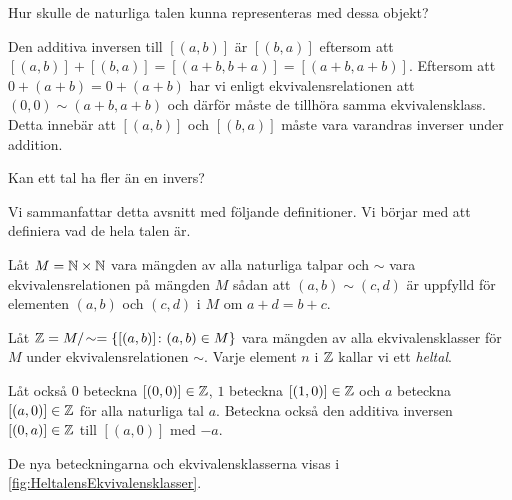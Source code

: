 \begin{exercise}
  Hur skulle de naturliga talen kunna representeras med dessa objekt?
\end{exercise}

Den additiva inversen till \([(a,b)]\) är \([(b,a)]\) eftersom att
\([(a,b)]+[(b,a)]=[(a+b,b+a)]=[(a+b,a+b)]\).
Eftersom att \(0+(a+b)=0+(a+b)\) har vi enligt ekvivalensrelationen att
\((0,0)\sim (a+b,a+b)\) och därför måste de tillhöra samma ekvivalensklass.
Detta innebär att \([(a,b)]\) och \([(b,a)]\) måste vara varandras inverser
under addition.

\begin{exercise}
  Kan ett tal ha fler än en invers?
\end{exercise}

Vi sammanfattar detta avsnitt med följande definitioner.
Vi börjar med att definiera vad de hela talen är.
\begin{definition}[Heltalen]
  Låt \(M=\mathbb{N}\times\mathbb{N}\) vara mängden av alla naturliga talpar och \(\sim\)
  vara ekvivalensrelationen på mängden \(M\) sådan att \((a,b)\sim (c,d)\)
  är uppfylld för elementen \((a,b)\) och \((c,d)\) i \(M\) om \(a+d=b+c\).

  Låt \(\mathbb{Z} = M/\!\sim = \{[(a,b)]\colon (a,b)\in M\}\) vara mängden av alla
  ekvivalensklasser för \(M\) under ekvivalensrelationen \(\sim\).
  Varje element \(n\) i \(\mathbb{Z}\) kallar vi ett \emph{heltal}.

  Låt också \(0\) beteckna \([(0,0)]\in\mathbb{Z}\), \(1\) beteckna \([(1,0)]\in\mathbb{Z}\)
  och \(a\) beteckna \([(a,0)]\in\mathbb{Z}\) för alla naturliga tal \(a\).
  Beteckna också den additiva inversen \([(0,a)]\in\mathbb{Z}\) till \([(a,0)]\) med
  \(-a\).
\end{definition}
De nya beteckningarna och ekvivalensklasserna visas i
\cref{fig:HeltalensEkvivalensklasser}.
